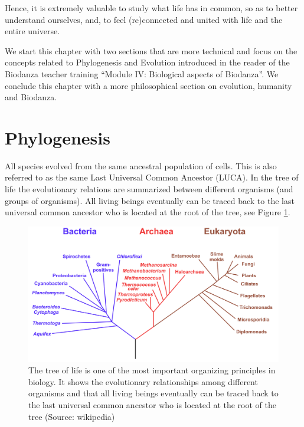 \documentclass[
  11pt,
]{book}
\begin{document}
Hence, it is extremely valuable to study what life has in common, so as to better understand ourselves, and, to feel (re)connected and united with life and the entire universe.

We start this chapter with two sections that are more technical and focus on the concepts related to Phylogenesis and Evolution introduced in the reader of the Biodanza teacher training ``Module IV: Biological aspects of Biodanza''. We conclude this chapter with a more philosophical section on evolution, humanity and Biodanza.

\hypertarget{phylogenesis}{%
\section{Phylogenesis}\label{phylogenesis}}

All species evolved from the same ancestral population of cells.
This is also referred to as the same Last Universal Common Ancestor (LUCA).
In the tree of life the evolutionary relations are summarized between different organisms (and groups of organisms). All living beings eventually can be traced back to the last universal common ancestor who is located at the root of the tree, see Figure \ref{fig:treeOfLifeBis}.

\begin{figure}

{\centering \includegraphics[width=1\linewidth]{./figs/Phylogenetic_tree} 

}

\caption{The tree of life is one of the most important organizing principles in biology. It shows the evolutionary relationships among different organisms and that all living beings eventually can be traced back to the last universal common ancestor who is located at the root of the tree (Source: wikipedia)}\label{fig:treeOfLifeBis}
\end{figure}
\end{document}
